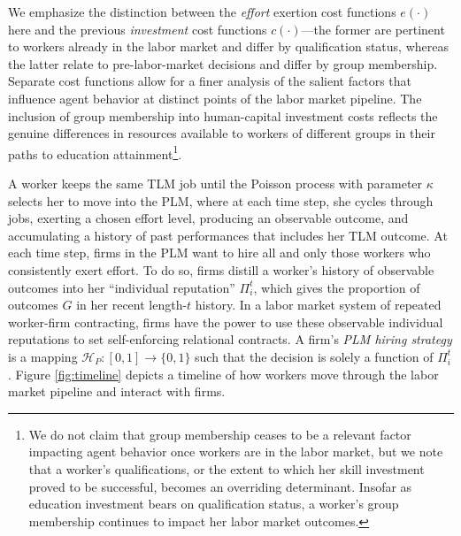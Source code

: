 \documentclass[sigconf]{acmart}
\theoremstyle{definition}
\begin{document}
We emphasize the distinction between the \textit{effort} exertion cost functions $e(\cdot)$ here and the previous \textit{investment} cost functions $c(\cdot)$---the former are pertinent to workers already in the labor market and differ by qualification status, whereas the latter relate to pre-labor-market decisions and differ by group membership. Separate cost functions allow for a finer analysis of the salient factors that influence agent behavior at distinct points of the labor market pipeline. The inclusion of group membership into human-capital investment costs reflects the genuine differences in resources available to workers of different groups in their paths to education attainment\footnote{We do not claim that group membership ceases to be a relevant factor impacting agent behavior once workers are in the labor market, but we note that a worker's qualifications, or the extent to which her skill investment proved to be successful, becomes an overriding determinant. Insofar as education investment bears on qualification status, a worker's group membership continues to impact her labor market outcomes.}. 


A worker keeps the same TLM job until the Poisson process with parameter $\kappa$ selects her to move into the PLM, where at each time step, she cycles through jobs, exerting a chosen effort level, producing an observable outcome, and accumulating a history of past performances that includes her TLM outcome. At each time step, firms in the PLM want to hire all and only those workers who consistently exert effort. To do so, firms distill a worker's history of observable outcomes into her ``individual reputation'' $\Pi^t_i$, which gives the proportion of outcomes $G$ in her recent length-$t$ history. In a labor market system of repeated worker-firm contracting, firms have the power to use these observable individual reputations to set self-enforcing relational contracts. A firm's \textit{PLM hiring strategy} is a mapping $\mathcal{H}_P: [0,1] \rightarrow \{0,1\}$ such that the decision is solely a function of $\Pi^t_i$. Figure \ref{fig:timeline} depicts a timeline of how workers move through the labor market pipeline and interact with firms. 
\end{document}
